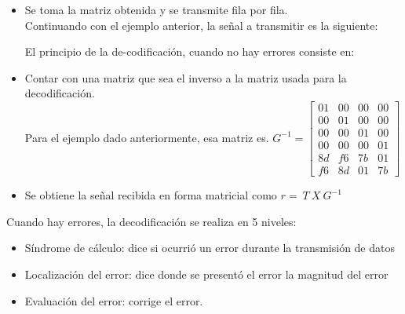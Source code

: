 \begin{itemize}
 \item Se toma la matriz obtenida y se transmite fila por fila. \\
 Continuando con el ejemplo anterior, la señal a transmitir es la siguiente:
 
\begin{table}[h!]
	\centering
\end{table}
 El principio de la de-codificación, cuando no hay errores consiste en:
 \item Contar con una matriz que sea el inverso a la matriz usada para la decodificación. \\
 
 Para el ejemplo dado anteriormente, esa matriz es. 
  $ G^{-1}= \begin{bmatrix}
    01 & 00 & 00 & 00 \\
    00 & 01 & 00 & 00 \\
    00 & 00 & 01 & 00 \\
    00 & 00 & 00 & 01 \\
    8d & f6 & 7b & 01 \\
    f6 & 8d & 01 & 7b 
\end{bmatrix}$

 \item Se obtiene la señal recibida en forma matricial como $r = \ T \ X \ G^{-1} $

 \end{itemize}
 
 Cuando hay errores, la decodificación se realiza en 5 niveles:
 \begin{itemize}
 \item  Síndrome de cálculo: dice si ocurrió un error  durante la transmisión de datos
 \item Localización del error: dice donde se presentó el error
la magnitud del error
 \item Evaluación del error: corrige el error.
 \end{itemize}
 
